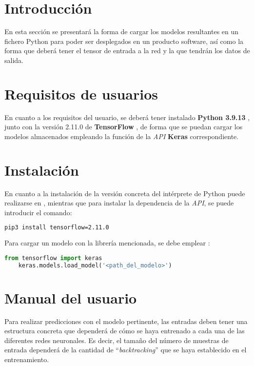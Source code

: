 
\section{Introducción}
En esta sección se presentará la forma de cargar los modelos resultantes en un fichero Python para poder ser desplegados en un producto software, 
así como la forma que deberá tener el tensor de entrada a la red y la que tendrán los datos de salida.

\section{Requisitos de usuarios}
En cuanto a los requisitos del usuario, se deberá tener instalado \textbf{Python 3.9.13} \cite{misc:python2023}, junto con la versión 2.11.0 de \textbf{TensorFlow} \cite{misc:tensorflow2023},
de forma que se puedan cargar los modelos almacenados empleando la función de la \textit{API} \textbf{Keras} correspondiente.

\section{Instalación}
En cuanto a la instalación de la versión concreta del intérprete de Python puede realizarse en \cite{misc:python2023}, mientras que para instalar la dependencia de la \textit{API},
se puede introducir el comando:
\begin{lstlisting}[language=Bash]
    pip3 install tensorflow=2.11.0
\end{lstlisting}

Para cargar un modelo con la librería mencionada, se debe emplear \cite{misc:tensorflow_save2023}:
\begin{lstlisting}[language=Python]
    from tensorflow import keras
    keras.models.load_model('<path_del_modelo>')
\end{lstlisting}

\section{Manual del usuario}
Para realizar predicciones con el modelo pertinente, las entradas deben tener una estructura concreta que dependerá de cómo se haya entrenado a cada una de las diferentes redes neuronales.
Es decir, el tamaño del número de muestras de entrada dependerá de la cantidad de ``\textit{backtracking}'' que se haya establecido en el entrenamiento.

